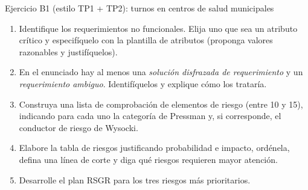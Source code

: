 \documentclass[11pt,a4paper]{article}
\begin{document}
\begin{enunciado}{Ejercicio B1 (estilo TP1 + TP2): turnos en centros de salud municipales}
\begin{enumerate}[label=\alph*)]
  \item Identifique los requerimientos no funcionales. Elija uno que sea un atributo crítico y especifíquelo con
  la plantilla de atributos (proponga valores razonables y justifíquelos).
  \item En el enunciado hay al menos una \emph{solución disfrazada de requerimiento} y un \emph{requerimiento
  ambiguo}. Identifíquelos y explique cómo los trataría.
  \item Construya una lista de comprobación de elementos de riesgo (entre 10 y 15), indicando para cada uno la
  categoría de Pressman y, si corresponde, el conductor de riesgo de Wysocki.
  \item Elabore la tabla de riesgos justificando probabilidad e impacto, ordénela, defina una línea de corte y
  diga qué riesgos requieren mayor atención.
  \item Desarrolle el plan RSGR para los tres riesgos más prioritarios.
\end{enumerate}
\end{enunciado}
\end{document}

